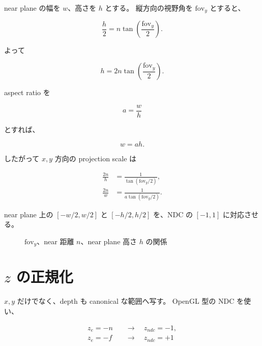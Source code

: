\documentclass[a4paper,11pt]{ltjsarticle}
\begin{document}
near plane の幅を $w$、高さを $h$ とする。
縦方向の視野角を $\mathrm{fov}_y$ とすると、

\[
  \frac{h}{2}
  =
  n\tan\left(\frac{\mathrm{fov}_y}{2}\right).
\]

よって

\[
  h
  =
  2n\tan\left(\frac{\mathrm{fov}_y}{2}\right).
\]

aspect ratio を

\[
  a=\frac{w}{h}
\]

とすれば、

\[
  w=ah.
\]

したがって $x,y$ 方向の projection scale は

\begin{align*}
  \frac{2n}{h}
  &=
  \frac{1}{\tan(\mathrm{fov}_y/2)},\\
  \frac{2n}{w}
  &=
  \frac{1}{a\tan(\mathrm{fov}_y/2)}.
\end{align*}

near plane 上の $[-w/2,w/2]$ と $[-h/2,h/2]$ を、NDC の $[-1,1]$ に対応させる。

\begin{figure}[htbp]
  \centering
  \caption{$\mathrm{fov}_y$、near 距離 $n$、near plane 高さ $h$ の関係}
\end{figure}

\section{$z$ の正規化}

$x,y$ だけでなく、depth も canonical な範囲へ写す。
OpenGL 型の NDC を使い、

\begin{align*}
  z_e=-n &\quad\longrightarrow\quad z_{ndc}=-1,\\
  z_e=-f &\quad\longrightarrow\quad z_{ndc}=+1
\end{align*}
\end{document}
